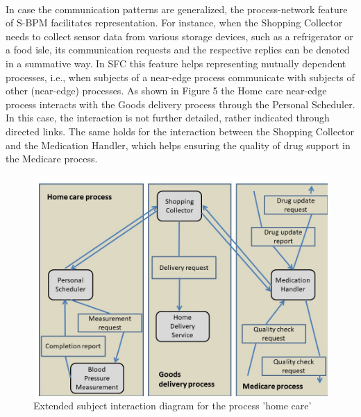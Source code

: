 \\
In case the communication patterns are generalized, the process-network feature of S-BPM facilitates representation. For instance, when the Shopping Collector needs to collect sensor data from various storage devices, such as a refrigerator or a food isle, its communication requests and the respective replies can be denoted in a summative way. In SFC this feature helps representing mutually dependent processes, i.e., when subjects of a near-edge process communicate with subjects of other (near-edge) processes. As shown in Figure 5 the Home care near-edge process interacts with the Goods delivery process through the Personal Scheduler. In this case, the interaction is not further detailed, rather indicated through directed links. The same holds for the interaction between the Shopping Collector and the Medication Handler, which helps ensuring the quality of drug support in the Medicare process.

\begin{figure}[htbp]
	\centering
	\includegraphics[width=0.6\linewidth] {Figures/Chapter5/Fog/InteractionHomeCare.jpg}
	\caption[Extended subject interaction diagram for the process ‘home care’]{Extended subject interaction diagram for the process 'home care'}
	\label{fig:InteractionHomeCare}
\end{figure}


